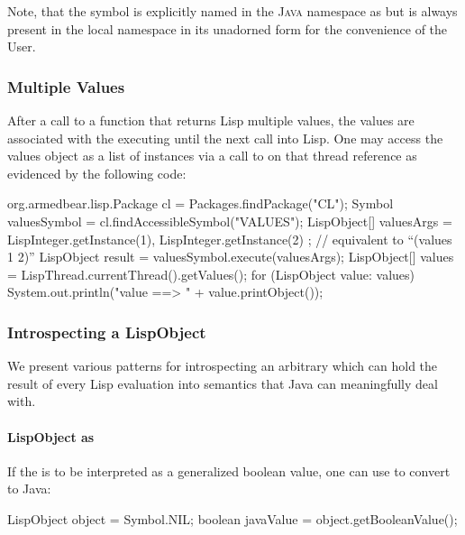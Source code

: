 \documentclass[10pt]{book}
\begin{document}
Note, that the symbol  is explicitly named in the
\textsc{Java} namespace as  but is always present in
the local namespace in its unadorned form for the convenience of the
User.

\subsubsection{Multiple Values}

After a call to a function that returns Lisp multiple values, the
values are associated with the executing  until the
next call into Lisp.  One may access the values object as a list of
 instances via a call to  on that
thread reference
as evidenced by the following code:

\begin{listing-java}

  org.armedbear.lisp.Package cl = Packages.findPackage("CL");
  Symbol valuesSymbol = cl.findAccessibleSymbol("VALUES");
  LispObject[] valuesArgs = {
    LispInteger.getInstance(1), LispInteger.getInstance(2)
  };
  // equivalent to ``(values 1 2)''
  LispObject result = valuesSymbol.execute(valuesArgs); 
  LispObject[] values = LispThread.currentThread().getValues();
  for (LispObject value: values) {
    System.out.println("value ==> " + value.printObject());
  }
\end{listing-java}

\subsubsection{Introspecting a LispObject}
\label{topic:Introspecting a LispObject}

We present various patterns for introspecting an arbitrary
 which can hold the result of every Lisp evaluation
into semantics that Java can meaningfully deal with.

\paragraph{LispObject as }

If the  is to be interpreted as a generalized boolean
value, one can use  to convert to Java:

\begin{listing-java}
   LispObject object = Symbol.NIL;
   boolean javaValue = object.getBooleanValue();
\end{listing-java}
\end{document}
